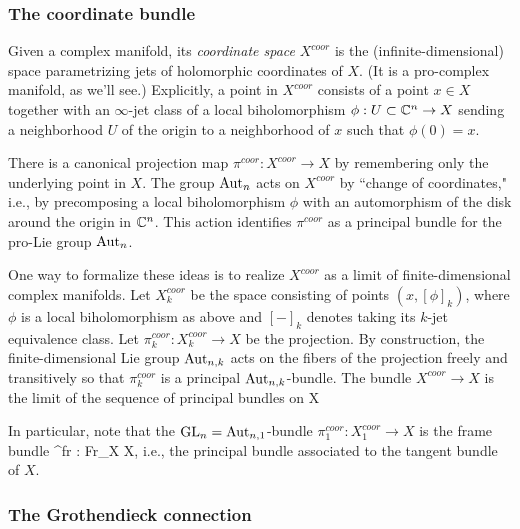 \subsubsection{The coordinate bundle}

Given a complex manifold, its {\em coordinate space} $X^{coor}$ is the (infinite-dimensional) space parametrizing jets of holomorphic coordinates of $X$. 
(It is a pro-complex manifold, as we'll see.) 
Explicitly, a point in $X^{coor}$ consists of a point $x \in X$ 
together with an $\infty$-jet class of a local biholomorphism $\phi : U \subset \mathbb C^n \to X$ 
sending a neighborhood $U$ of the origin to a neighborhood of $x$ such that $\phi(0) = x$. 

There is a canonical projection map $\pi^{coor} : X^{coor} \to X$ by remembering only the underlying point in $X$. 
The group ${\rm Aut}_n$ acts on $X^{coor}$ by ``change of coordinates," 
i.e., by precomposing a local biholomorphism $\phi$ with an automorphism of the disk around the origin in $\mathbb C^n$.
This action identifies $\pi^{coor}$ as a principal bundle for the pro-Lie group ${\rm Aut}_n$. 

One way to formalize these ideas is to realize $X^{coor}$ as a limit of finite-dimensional complex manifolds. 
Let $X_k^{coor}$ be the space consisting of points $(x, [\phi]_k)$, 
where $\phi$ is a local biholomorphism as above and $[-]_k$ denotes taking its $k$-jet equivalence class. 
Let $\pi_k^{coor} : X^{coor}_k \to X$ be the projection. 
By construction, the finite-dimensional Lie group ${\rm Aut}_{n,k}$ acts on the fibers of the projection freely and transitively 
so that $\pi_k^{coor}$ is a principal ${\rm Aut}_{n,k}$-bundle. The bundle $X^{coor} \to X$ is the limit of the sequence of principal bundles on X
\ben
{}
\een

In particular, note that the ${\rm GL}_n = {\rm Aut}_{n,1}$-bundle $\pi_1^{coor} : X^{coor}_1 \to X$ is the frame bundle
\ben
\pi^{fr} : {\rm Fr}_X \to X,
\een
i.e., the principal bundle associated to the tangent bundle of $X$.

\subsubsection{The Grothendieck connection} 

